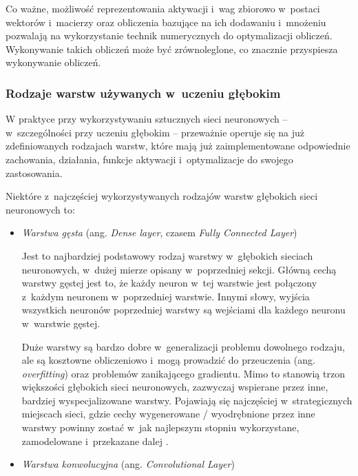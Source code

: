 {Co ważne, możliwość reprezentowania aktywacji i~wag zbiorowo w~postaci wektorów i~macierzy oraz obliczenia bazujące na ich dodawaniu i~mnożeniu pozwalają na wykorzystanie technik numerycznych do optymalizacji obliczeń.
Wykonywanie takich obliczeń może być zrównoleglone, co znacznie przyspiesza wykonywanie obliczeń.

\subsubsection{Rodzaje warstw używanych w~uczeniu głębokim}
\label{sec:deep-learning-layers}

W praktyce przy wykorzystywaniu sztucznych sieci neuronowych -- w~szczególności przy uczeniu głębokim -- przeważnie operuje się na już zdefiniowanych rodzajach warstw, które mają już zaimplementowane odpowiednie zachowania, działania, funkcje aktywacji i~optymalizacje do swojego zastosowania.

Niektóre z~najczęściej wykorzystywanych rodzajów warstw głębokich sieci neuronowych to:

\begin{itemize}

  \item \emph{Warstwa gęsta} (ang. \emph{Dense layer}, czasem \emph{Fully Connected Layer})

        Jest to najbardziej podstawowy rodzaj warstwy w~głębokich sieciach neuronowych, w~dużej mierze opisany w~poprzedniej sekcji.
        Główną cechą warstwy gęstej jest to, że każdy neuron w~tej warstwie jest połączony z~każdym neuronem w~poprzedniej warstwie.
        Innymi słowy, wyjścia wszystkich neuronów poprzedniej warstwy są wejściami dla każdego neuronu w~warstwie gęstej.

        Duże warstwy są bardzo dobre w~generalizacji problemu dowolnego rodzaju, ale są kosztowne obliczeniowo i~mogą prowadzić do przeuczenia (ang. \emph{overfitting}) oraz problemów
        zanikającego gradientu.
        Mimo to stanowią trzon większości głębokich sieci neuronowych, zazwyczaj wspierane przez inne, bardziej wyspecjalizowane warstwy.
        Pojawiają się najczęściej w~strategicznych miejscach sieci, gdzie cechy wygenerowane / wyodrębnione przez inne warstwy powinny zostać w~jak najlepszym stopniu wykorzystane, zamodelowane i~przekazane dalej \cite{josephine2021impact}.

  \item \emph{Warstwa konwolucyjna} (ang. \emph{Convolutional Layer})


\end{itemize}}
